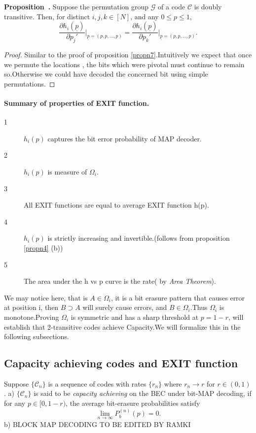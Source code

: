 \documentclass[
10pt, %
a4paper, %
oneside, %
headinclude,footinclude, %
BCOR5mm, %
]{scrartcl}
\newenvironment{proposition}[1][]{\refstepcounter{definition}\par\medskip
   \noindent \textbf{Proposition~\thedefinition. #1} \rmfamily}{\medskip}
\begin{document}
\begin{proposition}
Suppose the permutation group $\mathcal{G}$ of a code $\mathcal{C}$ is doubly transitive. Then, for distinct $i,j,k \in [N]$, and any $0 \le p \le 1$, $$\frac{\partial h_i(\underline{p})}{\partial p_j'}\Bigg|_{\underline{p}=(p,p,\ldots,p)} = \frac{\partial h_i(\underline{p})}{\partial p_k'}\Bigg|_{\underline{p}=(p,p,\ldots,p)}.$$
\begin{proof}
Similar to the proof of proposition \ref{propn7}.Intuitively we expect that once we permute the locations , the bits which were pivotal must continue to remain so.Otherwise we could have decoded the concerned bit using simple permutations.
\end{proof}
\label{propn8}
\end{proposition}
\paragraph*{Summary of properties of EXIT function.}
\begin{description}
\item[1] $h_i(p)$ captures the bit error probability of MAP decoder.
\item[2] $h_i(p)$ is measure of $\Omega_i$.
\item[3] All EXIT functions are equal to average EXIT function h(p).
\item[4] $h_i(p)$ is strictly increasing and invertible.(follows from proposition \ref{propn4} (b))
\item[5] The area under the h vs p curve is the rate( by \emph{Area Theorem}).
\end{description}
We may notice here, that is $A\in\Omega_i$, it is a bit erasure pattern that causes error at position i, then $B\supset A$ will surely cause errors, and $B\in\Omega_i$.Thus $\Omega_i$ is monotone.Proving $\Omega_i $ is symmetric and has a sharp threshold at $p=1-r$, will establish that 2-transitive codes achieve Capacity.We will formalize this in the following subsections.

\subsection*{Capacity achieving codes and EXIT function}
\begin{definition}
Suppose $\{\mathcal{C}_n\}$ is a sequence of codes with rates $\{r_n\}$ where $r_n \to r$ for $r \in (0,1)$.
a) $\{\mathcal{C}_n\}$ is said to be \emph{capacity achieving} on the BEC under bit-MAP decoding, if for any $p \in [0, 1-r)$, the average bit-erasure probabilities satisfy $$\lim_{n \to \infty} P_b^{(n)}(p) = 0.$$
b) BLOCK MAP DECODING TO BE EDITED BY RAMKI
\end{definition}
\label{def10}
\end{document}
